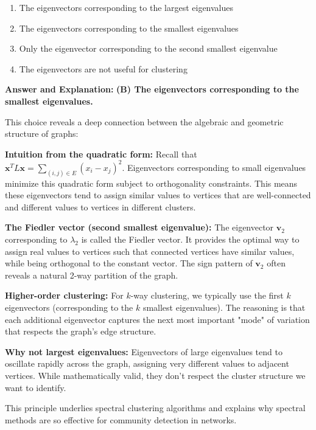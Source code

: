 \documentclass[11pt]{article}
\newenvironment{answer}{\color{answercolor}\begin{framed}\textbf{Answer and Explanation:}}{\end{framed}}
\begin{document}
\begin{enumerate}[label=(\Alph*)]
    \item The eigenvectors corresponding to the largest eigenvalues
    \item The eigenvectors corresponding to the smallest eigenvalues  
    \item Only the eigenvector corresponding to the second smallest eigenvalue
    \item The eigenvectors are not useful for clustering
\end{enumerate}

\begin{answer}
\textbf{(B) The eigenvectors corresponding to the smallest eigenvalues.}

This choice reveals a deep connection between the algebraic and geometric structure of graphs:

\textbf{Intuition from the quadratic form:}
Recall that $\mathbf{x}^T L \mathbf{x} = \sum_{(i,j) \in E} (x_i - x_j)^2$. Eigenvectors corresponding to small eigenvalues minimize this quadratic form subject to orthogonality constraints. This means these eigenvectors tend to assign similar values to vertices that are well-connected and different values to vertices in different clusters.

\textbf{The Fiedler vector (second smallest eigenvalue):}
The eigenvector $\mathbf{v}_2$ corresponding to $\lambda_2$ is called the Fiedler vector. It provides the optimal way to assign real values to vertices such that connected vertices have similar values, while being orthogonal to the constant vector. The sign pattern of $\mathbf{v}_2$ often reveals a natural 2-way partition of the graph.

\textbf{Higher-order clustering:}
For $k$-way clustering, we typically use the first $k$ eigenvectors (corresponding to the $k$ smallest eigenvalues). The reasoning is that each additional eigenvector captures the next most important "mode" of variation that respects the graph's edge structure.

\textbf{Why not largest eigenvalues:}
Eigenvectors of large eigenvalues tend to oscillate rapidly across the graph, assigning very different values to adjacent vertices. While mathematically valid, they don't respect the cluster structure we want to identify.

This principle underlies spectral clustering algorithms and explains why spectral methods are so effective for community detection in networks.
\end{answer}
\end{document}
